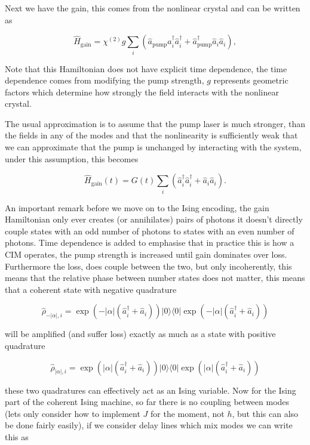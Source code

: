 \documentclass[english]{article}
\newcommand{\ketbra}[2]{\vert #1 \rangle \! \langle #2 \vert}
\begin{document}
Next we have the gain, this comes from the nonlinear crystal and can be written as

\begin{equation}
\hat{H}_\mathrm{gain}=\chi^{(2)}g\sum_i(\hat{a}_\mathrm{pump}\hat{a}_i^\dagger\hat{a}_i^\dagger+\hat{a}^\dagger_\mathrm{pump}\hat{a}_i\hat{a}_i),
\end{equation}

Note that this Hamiltonian does not have explicit time dependence, the time dependence comes from modifying the pump strength, $g$ represents geometric factors which determine how strongly the field interacts with the nonlinear crystal.

The usual approximation is to assume that the pump laser is much stronger,  than the fields in any of the modes and that the nonlinearity is sufficiently weak that we can approximate that the pump is unchanged by interacting with the system, under this assumption, this becomes

\begin{equation}
\hat{H}_\mathrm{gain}(t)=G(t) \sum_i(\hat{a}_i^\dagger\hat{a}_i^\dagger+\hat{a}_i\hat{a}_i).
\end{equation}

An important remark before we move on to the Ising encoding, the gain Hamiltonian only ever creates (or annihilates) pairs of photons it doesn't directly couple states with an odd number of photons to states with an even number of photons. Time dependence is added to emphasise that in practice this is how a CIM operates, the pump strength is increased until gain dominates over loss. Furthermore the loss, does couple between the two, but only incoherently,  this means that the relative phase between number states does not matter, this means that a coherent state with negative quadrature

\begin{equation}
\hat{\rho}_{-|\alpha|,i}=\exp(-|\alpha| (\hat{a}_i^\dagger+\hat{a}_i))\ketbra{0}{0}\exp(-|\alpha| (\hat{a}_i^\dagger+\hat{a}_i))
\end{equation}

will be amplified (and suffer loss) exactly as much as a state with positive quadrature

\begin{equation}
\hat{\rho}_{|\alpha|,i}=\exp(|\alpha| (\hat{a}_i^\dagger+\hat{a}_i))\ketbra{0}{0}\exp(|\alpha| (\hat{a}_i^\dagger+\hat{a}_i))
\end{equation}

these two quadratures can effectively act as an Ising variable. Now for the Ising part of the coherent Ising machine, so far there is no coupling between modes (lets only consider how to implement $J$ for the moment, not $h$, but this can also be done fairly easily), if we consider delay lines which mix modes we can write this as
\end{document}
